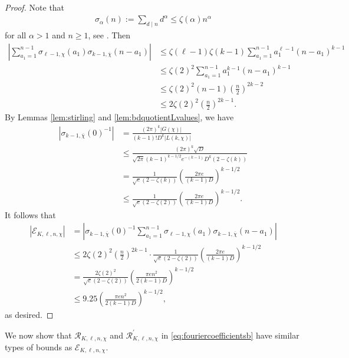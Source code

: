 \documentclass[11pt,letterpaper,reqno]{amsart}
\numberwithin{figure}{section}
\numberwithin{table}{section}
\theoremstyle{definition}
\theoremstyle{plain}
\theoremstyle{definition}
\theoremstyle{definition}
\theoremstyle{remark}
\numberwithin{equation}{section}
\theoremstyle{remark}
\begin{document}
\begin{proof}
    Note that 
\begin{align}\sigma_{\alpha}(n):=\sum_{d\mid n}d^{\alpha}\leq\zeta(\alpha)n^{\alpha}\label{eq:anotherboundforsigma}\end{align} for all $\alpha>1$ and $n\geq1$, see \cite[p.~245]{Nathansonbook}. Then 
    \begin{align*}
        \left|\sum_{a_1=1}^{n-1}\sigma_{\ell-1,\chi}(a_1)\sigma_{k-1,\overline{\chi}}(n-a_1)\right|&\leq\zeta(\ell-1)\zeta(k-1)\sum_{ a_1=1}^{n-1}a_1^{\ell-1}(n-a_1)^{k-1}\\&\le\zeta(2)^2\sum_{ a_1=1}^{ n-1}a_1^{k-1}(n-a_1)^{k-1}\\&\leq\zeta(2)^2(n-1)\left(\frac{n}{2}\right)^{2k-2}\\&\leq2\zeta(2)^2\left(\frac{n}{2}\right)^{2k-1}.
    \end{align*}
    By Lemmas \ref{lem:stirling} and \ref{lem:bdquotientLvalues}, we have 
    \begin{align}
        \left|\sigma_{k-1,\overline{\chi}}(0)^{-1}\right|&=\frac{(2\pi)^k|G(\chi)|}{(k-1)!D^k|L(k,\chi)|}  \nonumber\\&\leq\frac{(2\pi)^k\sqrt{D}}{\sqrt{2\pi}(k-1)^{k-1/2}e^{-(k-1)}D^k(2-\zeta(k))}
        \nonumber  \\&=\frac{1}{\sqrt{e}(2-\zeta(k))}\left(\frac{2\pi e}{(k-1)D}\right)^{k-1/2} \label{eq:sharperbd2/L}
        \\&\leq\frac{1}{\sqrt{e}(2-\zeta(2))}\left(\frac{2\pi e}{(k-1)D}\right)^{k-1/2}.\label{eq:bound2/L}
    \end{align}
It follows that 
    \begin{align*}
\left|\mathcal{E}_{K,\ell,n,\chi}\right|&=\left|\sigma_{k-1,\overline{\chi}}(0)^{-1}\sum_{a_1=1}^{n-1}\sigma_{\ell-1,\chi}(a_1)\sigma_{k-1,\overline{\chi}}(n-a_1)\right|\\
         &\leq2\zeta(2)^2\left(\frac{n}{2}\right)^{2k-1}\cdot \frac{1}{\sqrt{e}(2-\zeta(2))}\left(\frac{2\pi e}{(k-1)D}\right)^{k-1/2}\\&=\frac{2\zeta(2)^2}{\sqrt{e}(2-\zeta(2))}\left(\frac{\pi en^2}{2(k-1)D}\right)^{k-1/2}\\&\leq 9.25\left(\frac{\pi en^2}{2(k-1)D}\right)^{k-1/2},
    \end{align*}
    as desired. 
\end{proof}
We now show that $\mathcal{R}_{K,\ell,n,\chi}$ and $\mathcal{R}_{K,\ell,n,\chi}^{\prime}$ in \eqref{eq:fouriercoefficientsb} have similar types of bounds as $\mathcal{E}_{K,\ell,n,\chi}$.
\end{document}
